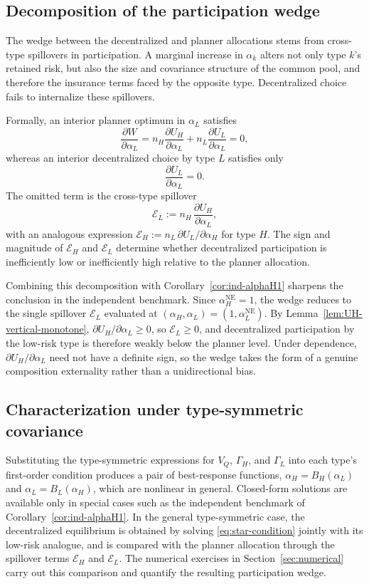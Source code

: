 \documentclass[a4paper,12pt]{article}
\theoremstyle{definition}
\theoremstyle{remark}
\newcommand{\1}{\mathbf{1}}
\begin{document}
\subsection{Decomposition of the participation wedge}

The wedge between the decentralized and planner allocations stems from
cross-type spillovers in participation. A marginal increase in \(\alpha_k\)
alters not only type \(k\)'s retained risk, but also the size and covariance
structure of the common pool, and therefore the insurance terms faced by the
opposite type. Decentralized choice fails to internalize these spillovers.

Formally, an interior planner optimum in \(\alpha_L\) satisfies
\[
\frac{\partial W}{\partial \alpha_L}
=
n_H\frac{\partial U_H}{\partial \alpha_L}
+
n_L\frac{\partial U_L}{\partial \alpha_L}
=0,
\]
whereas an interior decentralized choice by type \(L\) satisfies only
\[
\frac{\partial U_L}{\partial \alpha_L}=0.
\]
The omitted term is the cross-type spillover
\[
\mathcal{E}_L
:=
n_H\,\frac{\partial U_H}{\partial \alpha_L},
\]
with an analogous expression \(\mathcal{E}_H:=n_L\,\partial U_L/\partial\alpha_H\)
for type \(H\). The sign and magnitude of \(\mathcal E_H\) and
\(\mathcal E_L\) determine whether decentralized participation is
inefficiently low or inefficiently high relative to the planner allocation.

Combining this decomposition with Corollary~\ref{cor:ind-alphaH1} sharpens
the conclusion in the independent benchmark. Since
\(\alpha_H^{\mathrm{NE}}=1\), the wedge reduces to the single spillover
\(\mathcal E_L\) evaluated at \((\alpha_H,\alpha_L)=(1,\alpha_L^{\mathrm{NE}})\).
By Lemma~\ref{lem:UH-vertical-monotone}, \(\partial U_H/\partial\alpha_L\ge 0\),
so \(\mathcal E_L\ge 0\), and decentralized participation by the low-risk
type is therefore weakly below the planner level. Under dependence,
\(\partial U_H/\partial\alpha_L\) need not have a definite sign, so the wedge
takes the form of a genuine composition externality rather than a
unidirectional bias.

\subsection{Characterization under type-symmetric covariance}

Substituting the type-symmetric expressions for \(V_Q\), \(\Gamma_H\), and
\(\Gamma_L\) into each type's first-order condition produces a pair of
best-response functions, \(\alpha_H=B_H(\alpha_L)\) and
\(\alpha_L=B_L(\alpha_H)\), which are nonlinear in general. Closed-form
solutions are available only in special cases such as the independent
benchmark of Corollary~\ref{cor:ind-alphaH1}. In the general type-symmetric
case, the decentralized equilibrium is obtained by solving
\eqref{eq:star-condition} jointly with its low-risk analogue, and is
compared with the planner allocation through the spillover terms
\(\mathcal E_H\) and \(\mathcal E_L\). The numerical exercises in
Section~\ref{sec:numerical} carry out this comparison and quantify the
resulting participation wedge.
\end{document}
